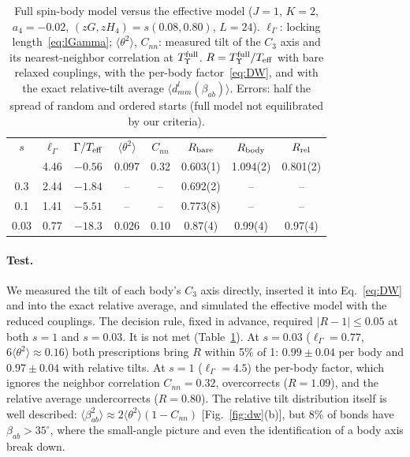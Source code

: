 \documentclass[pre,reprint,superscriptaddress,longbibliography,amsmath,amssymb,floatfix]{revtex4-2}
\begin{document}
\begin{table}[!tbp]
\caption{Full spin-body model versus the effective model ($J=1$, $K=2$, $a_4=-0.02$, $(zG,zH_4)=s(0.08,0.80)$, $L=24$). $\ell_\Gamma$: locking length~\eqref{eq:lGamma}; $\langle\theta^2\rangle$, $C_{nn}$: measured tilt of the $C_3$ axis and its nearest-neighbor correlation at $T^{\rm full}_\Upsilon$. $R=T^{\rm full}_\Upsilon/T_{\rm eff}$ with bare relaxed couplings, with the per-body factor~\eqref{eq:DW}, and with the exact relative-tilt average $\langle d^l_{mm}(\beta_{ab})\rangle$. Errors: half the spread of random and ordered starts (full model not equilibrated by our criteria).}
\label{tab:full}
\begin{ruledtabular}
\begin{tabular}{cccccccc}
$s$ & $\ell_\Gamma$ & $\Gamma/T_{\rm eff}$ & $\langle\theta^2\rangle$ & $C_{nn}$ & $R_{\rm bare}$ & $R_{\rm body}$ & $R_{\rm rel}$\\
\colrule
1    & 4.46 & $-0.56$ & 0.097 & 0.32 & 0.603(1) & 1.094(2) & 0.801(2)\\
0.3  & 2.44 & $-1.84$ & --    & --   & 0.692(2) & --       & --      \\
0.1  & 1.41 & $-5.51$ & --    & --   & 0.773(8) & --       & --      \\
0.03 & 0.77 & $-18.3$ & 0.026 & 0.10 & 0.87(4)  & 0.99(4)  & 0.97(4) \\
\end{tabular}
\end{ruledtabular}
\end{table}

\paragraph*{Test.} We measured the tilt of each body's $C_3$ axis directly, inserted it into Eq.~\eqref{eq:DW} and into the exact relative average, and simulated the effective model with the reduced couplings. The decision rule, fixed in advance, required $|R-1|\le0.05$ at both $s=1$ and $s=0.03$. It is not met (Table~\ref{tab:full}). At $s=0.03$ ($\ell_\Gamma=0.77$, $6\langle\theta^2\rangle\approx0.16$) both prescriptions bring $R$ within 5\% of 1: $0.99\pm0.04$ per body and $0.97\pm0.04$ with relative tilts. At $s=1$ ($\ell_\Gamma=4.5$) the per-body factor, which ignores the neighbor correlation $C_{nn}=0.32$, overcorrects ($R=1.09$), and the relative average undercorrects ($R=0.80$). The relative tilt distribution itself is well described: $\langle\beta^2_{ab}\rangle\approx2\langle\theta^2\rangle(1-C_{nn})$ [Fig.~\ref{fig:dw}(b)], but 8\% of bonds have $\beta_{ab}>35^\circ$, where the small-angle picture and even the identification of a body axis break down.
\end{document}
